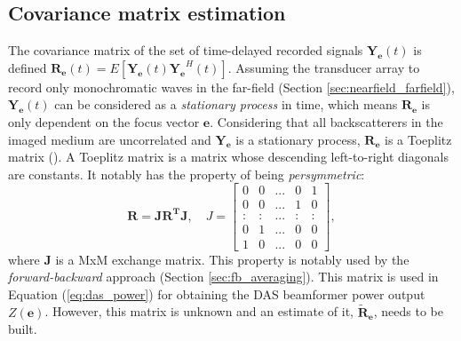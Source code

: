 \subsection{Covariance matrix estimation}
\label{sec:covariance_estimation}
The covariance matrix of the set of time-delayed recorded signals $\boldsymbol{Y_e}(t)$ is defined $\boldsymbol{R_e}(t) = E[\boldsymbol{Y_e}(t) \boldsymbol{Y_e}^H(t)]$.
Assuming the transducer array to record only monochromatic waves in the far-field (Section \ref{sec:nearfield_farfield}), $\boldsymbol{Y_e}(t)$ can be considered as a \textit{stationary process} in time, which means $\boldsymbol{R_e}$ is only dependent on the focus vector $\boldsymbol{e}$. Considering that all backscatterers in the imaged medium are uncorrelated and $\boldsymbol{Y_e}$ is a stationary process, $\boldsymbol{R_e}$ is a Toeplitz matrix (\cite{van_trees}). A Toeplitz matrix is a matrix whose descending left-to-right diagonals are constants. It notably has the property of being \textit{persymmetric}:
\begin{equation}
    \boldsymbol{R} = \boldsymbol{JR^TJ}, \quad J = \begin{bmatrix}
    0 & 0 & ... & 0 & 1 \\
    0 & 0 & ... & 1 & 0 \\
    : & : & ... & : & : \\
    0 & 1 & ... & 0 & 0 \\
    1 & 0 & ... & 0 & 0
    \end{bmatrix},
\label{eq:persymmetric}
\end{equation}
\noindent
where $\boldsymbol{J}$ is a MxM exchange matrix. This property is notably used by the \textit{forward-backward} approach (Section \ref{sec:fb_averaging}).
\noindent
This matrix is used in Equation (\ref{eq:das_power}) for obtaining the DAS beamformer power output $Z(\boldsymbol{e})$. However, this matrix is unknown and an estimate of it, $\boldsymbol{\tilde{R}_e}$, needs to be built.

